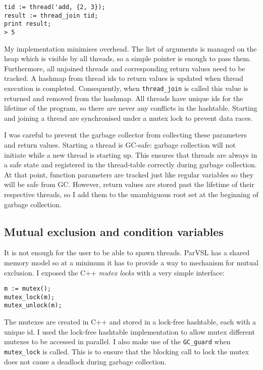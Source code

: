 \begin{verbatim}
tid := thread('add, {2, 3});
result := thread_join tid;
print result;
> 5
\end{verbatim}

My implementation minimises overhead. The list of arguments is managed on the heap which is visible by all
threads, so a simple pointer is enough to pass them. Furthermore, all unjoined threads and corresponding return values
need to be tracked.
A hashmap from thread ids to return values is updated when thread execution is completed.
Consequently, when \verb|thread_join| is called this value is returned and removed from the hashmap. All threads
have unique ids for the lifetime of the program, so there are never any conflicts in the hashtable.
Starting and joining a thread are synchronised under a mutex lock to prevent data races.

I was careful to prevent the garbage collector from collecting these parameters and return values.
Starting a thread is GC-safe: garbage collection will not initiate while a new thread is starting up. This ensures
that threads are always in a safe state and registered in the thread-table correctly during garbage collection.
At that point, function parameters are tracked just like regular variables so they will be safe from GC.
However, return values are stored past the lifetime of their respective threads, so I add them
to the unambiguous root set at the beginning of garbage collection.

\subsection{Mutual exclusion and condition variables}

It is not enough for the user to be able to spawn threads. ParVSL has a shared memory model so at a minimum
it has to provide a way to mechanism for mutual exclusion. I exposed the C++ \emph{mutex locks}
with a very simple interface:

\begin{verbatim}
m := mutex();
mutex_lock(m);
mutex_unlock(m);
\end{verbatim}

The mutexes are created in C++ and stored in a lock-free hashtable, each with a unique id. I used the lock-free
hashtable implementation to allow mutex different mutexes to be accessed in parallel. I also
make use of the \verb|GC_guard| when \verb|mutex_lock| is called. This is to ensure that the blocking
call to lock the mutex does not cause a deadlock during garbage collection.

